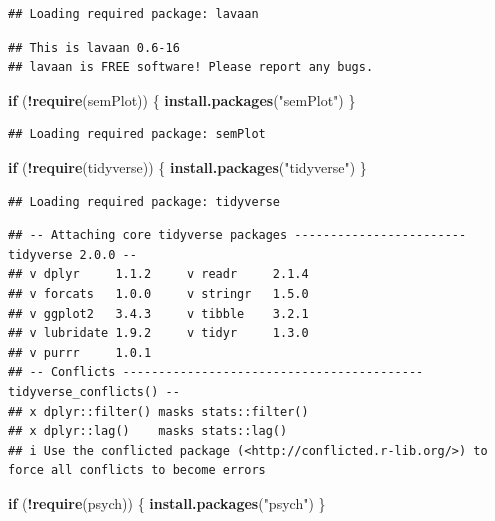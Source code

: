 \documentclass[
  11pt,
]{book}
\newenvironment{Shaded}{\begin{snugshade}}{\end{snugshade}}
\newcommand{\ControlFlowTok}[1]{\textcolor[rgb]{0.27,0.27,0.27}{\textbf{#1}}}
\newcommand{\FunctionTok}[1]{\textcolor[rgb]{0.27,0.27,0.27}{\textbf{#1}}}
\newcommand{\NormalTok}[1]{#1}
\newcommand{\SpecialCharTok}[1]{\textcolor[rgb]{0.43,0.43,0.43}{\textbf{#1}}}
\newcommand{\StringTok}[1]{\textcolor[rgb]{0.5,0.5,0.5}{#1}}
\begin{document}
\begin{verbatim}
## Loading required package: lavaan
\end{verbatim}

\begin{verbatim}
## This is lavaan 0.6-16
## lavaan is FREE software! Please report any bugs.
\end{verbatim}

\begin{Shaded}
\begin{Highlighting}[]
\ControlFlowTok{if}\NormalTok{ (}\SpecialCharTok{!}\FunctionTok{require}\NormalTok{(semPlot)) \{}
    \FunctionTok{install.packages}\NormalTok{(}\StringTok{"semPlot"}\NormalTok{)}
\NormalTok{\}}
\end{Highlighting}
\end{Shaded}

\begin{verbatim}
## Loading required package: semPlot
\end{verbatim}

\begin{Shaded}
\begin{Highlighting}[]
\ControlFlowTok{if}\NormalTok{ (}\SpecialCharTok{!}\FunctionTok{require}\NormalTok{(tidyverse)) \{}
    \FunctionTok{install.packages}\NormalTok{(}\StringTok{"tidyverse"}\NormalTok{)}
\NormalTok{\}}
\end{Highlighting}
\end{Shaded}

\begin{verbatim}
## Loading required package: tidyverse
\end{verbatim}

\begin{verbatim}
## -- Attaching core tidyverse packages ------------------------ tidyverse 2.0.0 --
## v dplyr     1.1.2     v readr     2.1.4
## v forcats   1.0.0     v stringr   1.5.0
## v ggplot2   3.4.3     v tibble    3.2.1
## v lubridate 1.9.2     v tidyr     1.3.0
## v purrr     1.0.1     
## -- Conflicts ------------------------------------------ tidyverse_conflicts() --
## x dplyr::filter() masks stats::filter()
## x dplyr::lag()    masks stats::lag()
## i Use the conflicted package (<http://conflicted.r-lib.org/>) to force all conflicts to become errors
\end{verbatim}

\begin{Shaded}
\begin{Highlighting}[]
\ControlFlowTok{if}\NormalTok{ (}\SpecialCharTok{!}\FunctionTok{require}\NormalTok{(psych)) \{}
    \FunctionTok{install.packages}\NormalTok{(}\StringTok{"psych"}\NormalTok{)}
\NormalTok{\}}
\end{Highlighting}
\end{Shaded}
\end{document}
